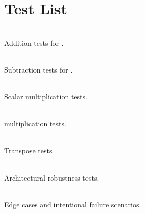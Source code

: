 \chapter{Test List }
\hypertarget{test}{}\label{test}

\begin{DoxyRefList}
\item[{\parbox[t]{\linewidth}{Member \doxylink{test__old__matrix_8cpp_a77422dc67c14a0b16c5097616db30e3e}{TEST\+\_\+\+CASE} ("{}\+Add\+Matrix Tests"{}, "{}\mbox{[}\+Addition\mbox{]}"{})}}]\hfill \\
\label{test__test000001}%
%
Addition tests for .  
\item[{\parbox[t]{\linewidth}{Member \doxylink{test__old__matrix_8cpp_a3cde3810629667aa37ca5211b98f5ae9}{TEST\+\_\+\+CASE} ("{}\+Sub\+Matrix Tests"{}, "{}\mbox{[}\+Subtraction\mbox{]}"{})}}]\hfill \\
\label{test__test000002}%
%
Subtraction tests for .  
\item[{\parbox[t]{\linewidth}{Member \doxylink{test__old__matrix_8cpp_a4e6b5f4348929056f693b5e93a556d36}{TEST\+\_\+\+CASE} ("{}\+Scalar\+Product Tests"{}, "{}\mbox{[}\+Scalar\mbox{]}"{})}}]\hfill \\
\label{test__test000003}%
%
Scalar multiplication tests.  
\item[{\parbox[t]{\linewidth}{Member \doxylink{test__old__matrix_8cpp_ac696f80a152c3018b2482c25918e7198}{TEST\+\_\+\+CASE} ("{}\+Product\+Matrix Tests"{}, "{}\mbox{[}\+Multiplication\mbox{]}"{})}}]\hfill \\
\label{test__test000004}%
%
 multiplication tests.  
\item[{\parbox[t]{\linewidth}{Member \doxylink{test__old__matrix_8cpp_a85c234c9b597c56e3738484cf4c728cb}{TEST\+\_\+\+CASE} ("{}\+Transpose\+Matrix Tests"{}, "{}\mbox{[}\+Transpose\mbox{]}"{})}}]\hfill \\
\label{test__test000005}%
%
Transpose tests.  
\item[{\parbox[t]{\linewidth}{Member \doxylink{test__old__matrix_8cpp_a3f21dbecbcdcb92db59ac0935a8fdb5e}{TEST\+\_\+\+CASE} ("{}\+Robustness and Performance"{}, "{}\mbox{[}\+Robustness\mbox{]}"{})}}]\hfill \\
\label{test__test000006}%
%
Architectural robustness tests. 
\item[{\parbox[t]{\linewidth}{Member \doxylink{test__old__matrix_8cpp_a53a8e57ec11c68a96e5f278e8a61fc33}{TEST\+\_\+\+CASE} ("{}\+Edge Cases / Failable Tests"{}, "{}\mbox{[}\+Failures\mbox{]}"{})}}]\hfill \\
\label{test__test000007}%
%
Edge cases and intentional failure scenarios.
\end{DoxyRefList}